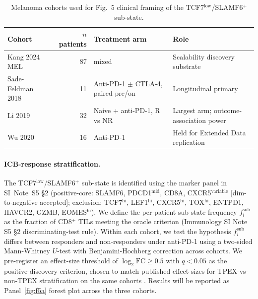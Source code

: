 \begin{table}[h]
\small
\caption{Melanoma cohorts used for Fig.\ 5 clinical framing of the TCF7$^{\text{low}}$/SLAMF6$^{+}$ sub-state.}
\label{tab:fig5-melanoma-cohorts}
\begin{tabular}{p{}rp{}p{}}
\toprule
Cohort & $n$ patients & Treatment arm & Role \\
\midrule
Kang 2024 MEL & 87 & mixed & Scalability discovery substrate \\
Sade-Feldman 2018 & 11 & Anti-PD-1 $\pm$ CTLA-4, paired pre/on & Longitudinal primary \\
Li 2019 & 32 & Naive + anti-PD-1, R vs NR & Largest arm; outcome-association power \\
Wu 2020 & 16 & Anti-PD-1 & Held for Extended Data replication \\
\bottomrule
\end{tabular}
\end{table}

\paragraph{ICB-response stratification.}
The TCF7$^{\text{low}}$/SLAMF6$^{+}$ sub-state is identified using the marker panel in SI~Note~S5 \S2 (positive-core: SLAMF6, PDCD1$^{\text{mid}}$, CD8A, CXCR5$^{\text{variable}}$ [dim-to-negative accepted]; exclusion: TCF7$^{\text{hi}}$, LEF1$^{\text{hi}}$, CXCR5$^{\text{hi}}$, TOX$^{\text{hi}}$, ENTPD1, HAVCR2, GZMB, EOMES$^{\text{hi}}$). We define the per-patient sub-state frequency $f^{\text{sub}}_i$ as the fraction of CD8$^{+}$ TILs meeting the oracle criterion (Immunology SI Note S5 \S2 discriminating-test rule). Within each cohort, we test the hypothesis $f^{\text{sub}}_i$ differs between responders and non-responders under anti-PD-1 using a two-sided Mann-Whitney $U$-test with Benjamini-Hochberg correction across cohorts. We pre-register an effect-size threshold of $\log_2 \text{FC} \ge 0.5$ with $q < 0.05$ as the positive-discovery criterion, chosen to match published effect sizes for TPEX-vs-non-TPEX stratification on the same cohorts \citep{Sade-Feldman2018Cell,Miller2019NatImmunol}. Results will be reported as Panel~\ref{fig:f5a} forest plot across the three cohorts.

